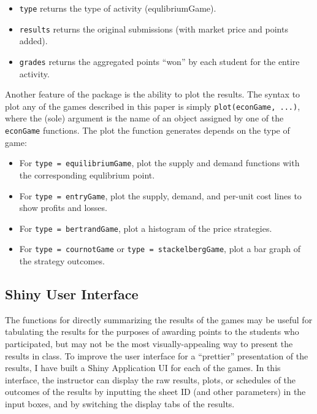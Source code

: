 \documentclass[
]{article}
\providecommand{\tightlist}{%
  \setlength{\itemsep}{0pt}\setlength{\parskip}{0pt}}
\begin{document}
\begin{itemize}
\begin{itemize}
    \begin{itemize}
    \tightlist
    \item
      \texttt{type} returns the type of activity (equlibriumGame).
    \item
      \texttt{results} returns the original submissions (with market
      price and points added).
    \item
      \texttt{grades} returns the aggregated points ``won'' by each
      student for the entire activity.
    \end{itemize}
  \end{itemize}
\end{itemize}

Another feature of the package is the ability to plot the results. The
syntax to plot any of the games described in this paper is simply
\texttt{plot(econGame,\ ...)}, where the (sole) argument is the name of
an object assigned by one of the \texttt{econGame} functions. The plot
the function generates depends on the type of game:

\begin{itemize}
\tightlist
\item
  For
  \texttt{type\ =\ \textquotesingle{}equilibriumGame\textquotesingle{}},
  plot the supply and demand functions with the corresponding equlibrium
  point.
\item
  For \texttt{type\ =\ \textquotesingle{}entryGame\textquotesingle{}},
  plot the supply, demand, and per-unit cost lines to show profits and
  losses.
\item
  For
  \texttt{type\ =\ \textquotesingle{}bertrandGame\textquotesingle{}},
  plot a histogram of the price strategies.
\item
  For \texttt{type\ =\ \textquotesingle{}cournotGame\textquotesingle{}}
  or
  \texttt{type\ =\ \textquotesingle{}stackelbergGame\textquotesingle{}},
  plot a bar graph of the strategy outcomes.
\end{itemize}

\hypertarget{shiny-user-interface}{%
\subsection{Shiny User Interface}\label{shiny-user-interface}}

The functions for directly summarizing the results of the games may be
useful for tabulating the results for the purposes of awarding points to
the students who participated, but may not be the most
visually-appealing way to present the results in class. To improve the
user interface for a ``prettier'' presentation of the results, I have
built a Shiny Application UI for each of the games. In this interface,
the instructor can display the raw results, plots, or schedules of the
outcomes of the results by inputting the sheet ID (and other parameters)
in the input boxes, and by switching the display tabs of the results.
\end{document}
